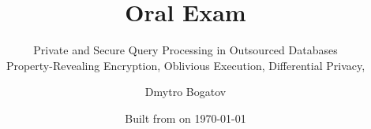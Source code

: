 \title{Oral Exam}

\subtitle{
	Private and Secure Query Processing in Outsourced Databases \\
	{\small Property-Revealing Encryption, Oblivious Execution, Differential Privacy, \epsolute{}}
}

\date{Built from \href{https://git.dbogatov.org/bu/oral-exam/commit/\version}{\emph{\version}} on \today}

\author{Dmytro Bogatov \\ }


\def\wm{\begin{tabular}{c} Dmytro Bogatov \\ Boston University \end{tabular}}
